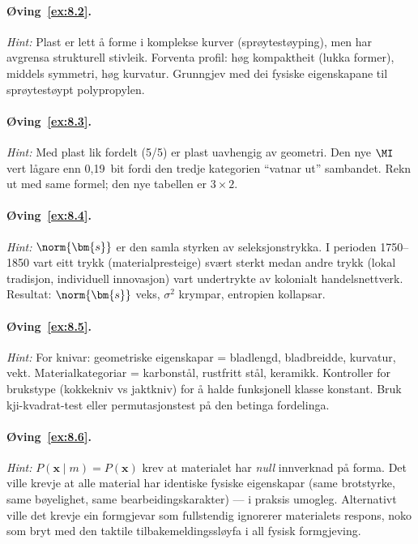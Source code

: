 \paragraph{Øving~\ref{ex:8.2}.}
\emph{Hint:} Plast er lett å forme i komplekse kurver
(sprøytestøyping), men har avgrensa strukturell stivleik. Forventa
profil: høg kompaktheit (lukka former), middels symmetri, høg
kurvatur. Grunngjev med dei fysiske eigenskapane til sprøytestøypt
polypropylen.

\paragraph{Øving~\ref{ex:8.3}.}
\emph{Hint:} Med plast lik fordelt (5/5) er plast uavhengig av
geometri. Den nye $\MI$ vert lågare enn 0{,}19~bit fordi den
tredje kategorien ``vatnar ut'' sambandet. Rekn ut med same
formel; den nye tabellen er $3 \times 2$.

\paragraph{Øving~\ref{ex:8.4}.}
\emph{Hint:} $\norm{\bm{s}}$ er den samla styrken av
seleksjonstrykka. I perioden 1750--1850 vart eitt trykk
(materialpresteige) svært sterkt medan andre trykk (lokal
tradisjon, individuell innovasjon) vart undertrykte av kolonialt
handelsnettverk. Resultat: $\norm{\bm{s}}$ veks,
$\sigma^2$ krympar, entropien kollapsar.

\paragraph{Øving~\ref{ex:8.5}.}
\emph{Hint:} For knivar: geometriske eigenskapar = bladlengd,
bladbreidde, kurvatur, vekt. Materialkategoriar = karbonstål,
rustfritt stål, keramikk. Kontroller for brukstype (kokkekniv vs
jaktkniv) for å halde funksjonell klasse konstant.
Bruk kji-kvadrat-test eller permutasjonstest på den betinga
fordelinga.

\paragraph{Øving~\ref{ex:8.6}.}
\emph{Hint:} $P(\bm{x} \mid m) = P(\bm{x})$ krev at materialet
har \emph{null} innverknad på forma. Det ville krevje at alle
material har identiske fysiske eigenskapar (same brotstyrke, same
bøyelighet, same bearbeidingskarakter) --- i praksis umogleg.
Alternativt ville det krevje ein formgjevar som fullstendig
ignorerer materialets respons, noko som bryt med den taktile
tilbakemeldingssløyfa i all fysisk formgjeving.


